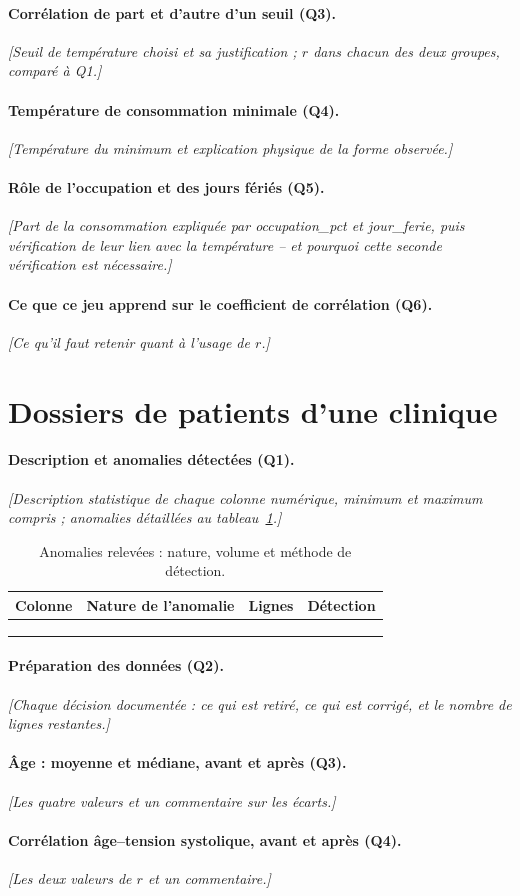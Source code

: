\documentclass[12pt,letterpaper]{article}
\newcommand{\ph}[1]{{\color{gray}\itshape [#1]}}
\newcommand{\qst}[1]{\paragraph{#1.}}
\begin{document}
\qst{Corrélation de part et d'autre d'un seuil (Q3)}
\ph{Seuil de température choisi et sa justification ; $r$ dans chacun des
deux groupes, comparé à Q1.}

\qst{Température de consommation minimale (Q4)}
\ph{Température du minimum et explication physique de la forme observée.}

\qst{Rôle de l'occupation et des jours fériés (Q5)}
\ph{Part de la consommation expliquée par \textsf{occupation\_pct} et
\textsf{jour\_ferie}, puis vérification de leur lien avec la température
-- et pourquoi cette seconde vérification est nécessaire.}

\qst{Ce que ce jeu apprend sur le coefficient de corrélation (Q6)}
\ph{Ce qu'il faut retenir quant à l'usage de $r$.}

\section{Dossiers de patients d'une clinique}

\qst{Description et anomalies détectées (Q1)}
\ph{Description statistique de chaque colonne numérique, minimum et maximum
compris ; anomalies détaillées au tableau~\ref{tab:jeu3-anomalies}.}

\begin{table}[H]
  \centering\small
  \caption{Anomalies relevées : nature, volume et méthode de détection.}
  \label{tab:jeu3-anomalies}
  \begin{tabular}{llrl}
    \toprule
    Colonne & Nature de l'anomalie & Lignes & Détection\\
    \midrule
     &  &  & \\
     &  &  & \\
     &  &  & \\
    \bottomrule
  \end{tabular}
\end{table}

\qst{Préparation des données (Q2)}
\ph{Chaque décision documentée : ce qui est retiré, ce qui est corrigé, et
le nombre de lignes restantes.}

\qst{Âge : moyenne et médiane, avant et après (Q3)}
\ph{Les quatre valeurs et un commentaire sur les écarts.}

\qst{Corrélation âge--tension systolique, avant et après (Q4)}
\ph{Les deux valeurs de $r$ et un commentaire.}
\end{document}
